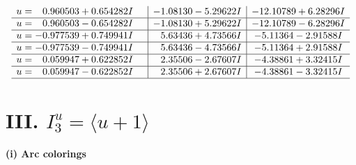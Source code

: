 \documentclass[1p]{elsarticle_modified}
\theoremstyle{definition}
\begin{document}
$$\begin{array}{c|c|c}
\begin{aligned}
u &= \phantom{-}0.960503 + 0.654282 I\end{aligned}
 & -1.08130 - 5.29622 I & -12.10789 + 6.28296 I \\ \hline\begin{aligned}
u &= \phantom{-}0.960503 - 0.654282 I\end{aligned}
 & -1.08130 + 5.29622 I & -12.10789 - 6.28296 I \\ \hline\begin{aligned}
u &= -0.977539 + 0.749941 I\end{aligned}
 & \phantom{-}5.63436 + 4.73566 I & -5.11364 - 2.91588 I \\ \hline\begin{aligned}
u &= -0.977539 - 0.749941 I\end{aligned}
 & \phantom{-}5.63436 - 4.73566 I & -5.11364 + 2.91588 I \\ \hline\begin{aligned}
u &= \phantom{-}0.059947 + 0.622852 I\end{aligned}
 & \phantom{-}2.35506 - 2.67607 I & -4.38861 + 3.32415 I \\ \hline\begin{aligned}
u &= \phantom{-}0.059947 - 0.622852 I\end{aligned}
 & \phantom{-}2.35506 + 2.67607 I & -4.38861 - 3.32415 I\\
 \hline 
 \end{array}$$\newpage\newpage\renewcommand{\arraystretch}{1}
\centering \section*{III. $I^u_{3}= \langle u+1 \rangle$}
\flushleft \textbf{(i) Arc colorings}\\
\end{document}

